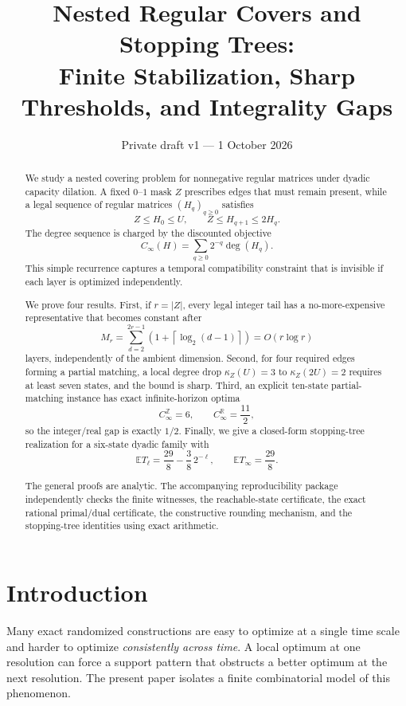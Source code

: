 \documentclass[11pt]{article}
\title{Nested Regular Covers and Stopping Trees:\\
Finite Stabilization, Sharp Thresholds, and Integrality Gaps}
\author{}
\date{Private draft v1 --- 1 October 2026}
\theoremstyle{definition}
\newcommand{\degm}{\operatorname{deg}}
\newcommand{\R}{\mathbb R}
\newcommand{\Z}{\mathbb Z}
\begin{document}
\maketitle

\begin{abstract}
We study a nested covering problem for nonnegative regular matrices under dyadic capacity dilation.
A fixed $0$--$1$ mask $Z$ prescribes edges that must remain present, while a legal sequence
of regular matrices $(H_q)_{q\ge 0}$ satisfies
\[
Z\le H_0\le U,
\qquad
Z\le H_{q+1}\le 2H_q .
\]
The degree sequence is charged by the discounted objective
\[
C_\infty(H)=\sum_{q\ge0}2^{-q}\degm(H_q).
\]
This simple recurrence captures a temporal compatibility constraint that is invisible if each layer
is optimized independently.

We prove four results. First, if $r=|Z|$, every legal integer tail has a no-more-expensive representative
that becomes constant after
\[
M_r
=
\sum_{d=2}^{2r-1}
\left(1+\left\lceil\log_2(d-1)\right\rceil\right)
=
O(r\log r)
\]
layers, independently of the ambient dimension.
Second, for four required edges forming a partial matching, a local degree drop
$\kappa_Z(U)=3$ to $\kappa_Z(2U)=2$ requires at least seven states, and the bound is sharp.
Third, an explicit ten-state partial-matching instance has exact infinite-horizon optima
\[
C_\infty^{\Z}=6,
\qquad
C_\infty^{\R}=\frac{11}{2},
\]
so the integer/real gap is exactly $1/2$.
Finally, we give a closed-form stopping-tree realization for a six-state dyadic family with
\[
\mathbb E T_\ell
=
\frac{29}{8}-\frac38\,2^{-\ell},
\qquad
\mathbb E T_\infty=\frac{29}{8}.
\]

The general proofs are analytic.  The accompanying reproducibility package independently checks
the finite witnesses, the reachable-state certificate, the exact rational primal/dual certificate,
the constructive rounding mechanism, and the stopping-tree identities using exact arithmetic.
\end{abstract}

\section{Introduction}

Many exact randomized constructions are easy to optimize at a single time scale and harder to
optimize \emph{consistently across time}.  A local optimum at one resolution can force a support
pattern that obstructs a better optimum at the next resolution.  The present paper isolates a
finite combinatorial model of this phenomenon.
\end{document}
